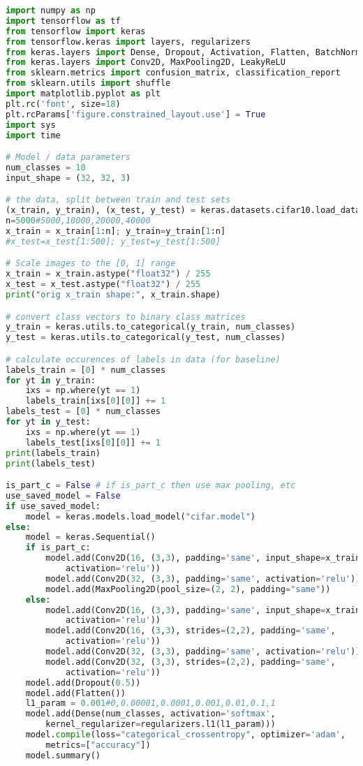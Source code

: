 \documentclass[12pt]{article}
\begin{document}
\lstset{basicstyle=\footnotesize}
\begin{lstlisting}[language=Python]
import numpy as np
import tensorflow as tf
from tensorflow import keras
from tensorflow.keras import layers, regularizers
from keras.layers import Dense, Dropout, Activation, Flatten, BatchNormalization
from keras.layers import Conv2D, MaxPooling2D, LeakyReLU
from sklearn.metrics import confusion_matrix, classification_report
from sklearn.utils import shuffle
import matplotlib.pyplot as plt
plt.rc('font', size=18)
plt.rcParams['figure.constrained_layout.use'] = True
import sys
import time

# Model / data parameters
num_classes = 10
input_shape = (32, 32, 3)

# the data, split between train and test sets
(x_train, y_train), (x_test, y_test) = keras.datasets.cifar10.load_data()
n=5000#5000,10000,20000,40000
x_train = x_train[1:n]; y_train=y_train[1:n]
#x_test=x_test[1:500]; y_test=y_test[1:500]

# Scale images to the [0, 1] range
x_train = x_train.astype("float32") / 255
x_test = x_test.astype("float32") / 255
print("orig x_train shape:", x_train.shape)

# convert class vectors to binary class matrices
y_train = keras.utils.to_categorical(y_train, num_classes)
y_test = keras.utils.to_categorical(y_test, num_classes)

# calculate occurences of labels in data (for baseline)
labels_train = [0] * num_classes
for yt in y_train:
	ixs = np.where(yt == 1)
	labels_train[ixs[0][0]] += 1
labels_test = [0] * num_classes
for yt in y_test:
	ixs = np.where(yt == 1)
	labels_test[ixs[0][0]] += 1
print(labels_train)
print(labels_test)

is_part_c = False # if is_part_c then use max pooling, etc
use_saved_model = False
if use_saved_model:
	model = keras.models.load_model("cifar.model")
else:
	model = keras.Sequential()
	if is_part_c:
		model.add(Conv2D(16, (3,3), padding='same', input_shape=x_train.shape[1:],
		    activation='relu'))
		model.add(Conv2D(32, (3,3), padding='same', activation='relu'))
		model.add(MaxPooling2D(pool_size=(2, 2), padding="same"))
	else:
		model.add(Conv2D(16, (3,3), padding='same', input_shape=x_train.shape[1:],
		    activation='relu'))
		model.add(Conv2D(16, (3,3), strides=(2,2), padding='same',
		    activation='relu'))
		model.add(Conv2D(32, (3,3), padding='same', activation='relu'))
		model.add(Conv2D(32, (3,3), strides=(2,2), padding='same',
		    activation='relu'))
	model.add(Dropout(0.5))
	model.add(Flatten())
	l1_param = 0.001#0,0.00001,0.0001,0.001,0.01,0.1,1
	model.add(Dense(num_classes, activation='softmax',
	    kernel_regularizer=regularizers.l1(l1_param)))
	model.compile(loss="categorical_crossentropy", optimizer='adam',
	    metrics=["accuracy"])
	model.summary()


\end{lstlisting}
\end{document}
